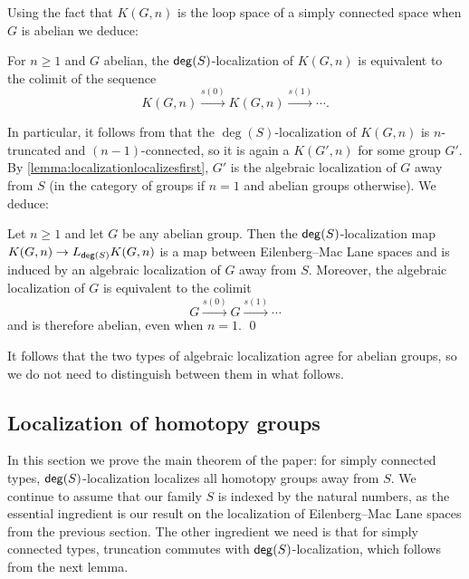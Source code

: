 Using the fact that $K(G,n)$ is the loop space of a simply connected space
when $G$ is abelian we deduce:

\begin{cor}\label{corollary:localizationKgn}
    For $n \geq 1$ and $G$ abelian,
    the $\mathsf{deg}(S)$-localization of $K(G,n)$ is equivalent to the colimit of the sequence
    \[
      K(G,n) \xrightarrow{s(0)} K(G,n) \xrightarrow{s(1)} \cdots .  \tag*{\qed}
    \]
\end{cor}

In particular, it follows from \cite{DoornRijkeSojakova} that the
$\deg(S)$-localization of $K(G,n)$ is $n$-truncated and $(n-1)$-connected,
so it is again a $K(G',n)$ for some group $G'$.
By \cref{lemma:localizationlocalizesfirst}, $G'$ is the algebraic localization of $G$
away from $S$ (in the category of groups if $n = 1$ and abelian groups otherwise).
We deduce:

\begin{thm}\label{theorem:localizationKgn}
    Let $n\geq 1$ and let $G$ be any abelian group.
    Then the $\mathsf{deg}(S)$-localization map $K(G,n) \to L_{\mathsf{deg}(S)} K(G,n)$ is a map between Eilenberg--Mac Lane spaces and
    is induced by an algebraic localization of $G$ away from $S$.
    Moreover, the algebraic localization of $G$ is equivalent to the colimit
    \[
      G \xrightarrow{s(0)} G \xrightarrow{s(1)} \cdots
    \]
    and is therefore abelian, even when $n = 1$.  \qed
\end{thm}

It follows that the two types of algebraic localization agree for abelian groups,
so we do not need to distinguish between them in what follows.

\subsection{Localization of homotopy groups}\label{ss:localization-of-homotopy-groups}

In this section we prove the main theorem of the paper:
for simply connected types, $\mathsf{deg}(S)$-localization localizes all homotopy groups away from $S$.
We continue to assume that our family $S$ is indexed by the natural numbers,
as the essential ingredient is our result on the localization of Eilenberg--Mac Lane spaces from the previous section.
The other ingredient we need is that for simply connected types,
truncation commutes with $\mathsf{deg}(S)$-localization, which follows
from the next lemma.

